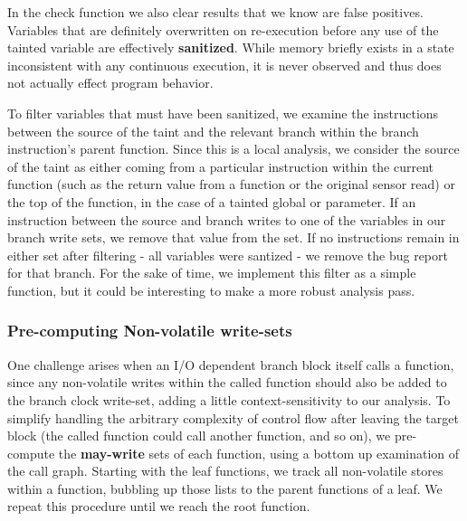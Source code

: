 In the check function we also clear results that we know are false positives. Variables that are definitely overwritten on re-execution before any use of the tainted variable are effectively \textbf{sanitized}. While memory briefly exists in a state inconsistent with any continuous execution, it is never observed and thus does not actually effect program behavior.

To filter variables that must have been sanitized, we examine the instructions between the source of the taint and the relevant branch within the branch instruction's parent function. Since this is a local analysis, we consider the source of the taint as either coming from a particular instruction within the current function (such as the return value from a function or the original sensor read) or the top of the function, in the case of a tainted global or parameter. If an instruction between the source and branch writes to one of the variables in our branch write sets, we remove that value from the set. If no instructions remain in either set after filtering - all variables were santized - we remove the bug report for that branch. For the sake of time, we implement this filter as a simple function, but it could be interesting to make a more robust analysis pass.

\subsubsection{Pre-computing Non-volatile write-sets}

One challenge arises when an I/O dependent branch block itself calls a function, since any non-volatile writes within the called function should also be added to the branch clock write-set, adding a little context-sensitivity to our analysis.  To simplify handling the arbitrary complexity of control flow after leaving the target block (the called function could call another function, and so on), we pre-compute the {\bf may-write} sets of each function, using a bottom up examination of the call graph. Starting with the leaf functions, we track all non-volatile stores within a function, bubbling up those lists to the parent functions of a leaf. We repeat this procedure until we reach the root function. 
